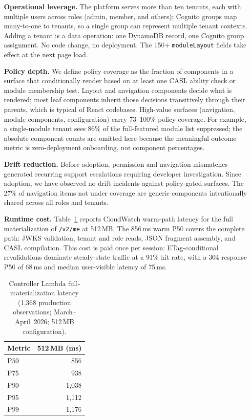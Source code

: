 \documentclass[10pt,journal]{IEEEtran}
\newcommand{\code}[1]{{\small\textcolor{CausifyBlue}{\texttt{#1}}}}
\begin{document}
\noindent\textbf{Operational leverage.} The platform serves more than ten tenants,
each with multiple users across roles (admin, member, and others); Cognito
groups map many-to-one to tenants, so a single group can represent multiple
tenant contexts. Adding a tenant is a data operation: one DynamoDB record,
one Cognito group assignment. No code change, no deployment. The 150+
\code{moduleLayout} fields take effect at the next page load.

\noindent\textbf{Policy depth.} We define policy coverage as the fraction of
components in a surface that conditionally render based on at least one
CASL ability check or module membership test. Layout and navigation
components decide what is rendered; most leaf components inherit those
decisions transitively through their parents, which is typical of React
codebases. High-value surfaces (navigation, module components,
configuration) carry 73--100\% policy coverage. For example,
a single-module tenant sees 86\% of the full-featured module list suppressed;
the absolute component counts are omitted here because the meaningful outcome
metric is zero-deployment onboarding, not component percentages.

\noindent\textbf{Drift reduction.} Before adoption, permission and navigation
mismatches generated recurring support escalations requiring developer
investigation. Since adoption, we have observed no drift incidents against
policy-gated surfaces. The 27\% of navigation items not under coverage are
generic components intentionally shared across all roles and tenants.

\noindent\textbf{Runtime cost.} Table~\ref{tab:runtime} reports CloudWatch warm-path
latency for the full materialization of \code{/v2/me} at 512\,MB. The 856\,ms
warm P50 covers the complete path: JWKS validation, tenant and role reads,
JSON fragment assembly, and CASL compilation. This cost is paid once per
session: ETag-conditional revalidations dominate steady-state traffic at a
91\% hit rate, with a 304 response P50 of 68\,ms and median user-visible
latency of 75\,ms.

\begin{table}[h!]
  \centering
  \caption{Controller Lambda full-materialization latency
  (1{,}368 production observations; March--April~2026; 512\,MB configuration).}
  \label{tab:runtime}
  \small
  \begin{tabularx}{\columnwidth}{X r}
    \toprule
    \textbf{Metric} & \textbf{512\,MB (ms)} \\
    \midrule
    P50      & 856     \\
    P75      & 938     \\
    P90      & 1{,}038 \\
    P95      & 1{,}112 \\
    P99      & 1{,}176 \\
    \bottomrule
  \end{tabularx}
\end{table}
\end{document}
